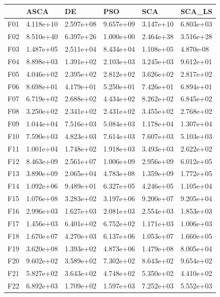\begin{tabular}{llllll}
\toprule
{} &       ASCA &         DE &        PSO &        SCA &     SCA\_LS \\
\midrule
F01  &  4.118e+10 &  2.597e+08 &  9.657e+09 &  3.147e+10 &  6.803e+03 \\
F02  &  8.510e+40 &  6.397e+26 &  1.000e+00 &  2.464e+38 &  3.516e+28 \\
F03  &  1.487e+05 &  2.511e+04 &  8.434e+04 &  1.108e+05 &  4.870e-08 \\
F04  &  8.898e+03 &  1.391e+02 &  2.103e+03 &  3.245e+03 &  9.612e+01 \\
F05  &  4.046e+02 &  2.395e+02 &  2.812e+02 &  3.626e+02 &  2.817e+02 \\
F06  &  8.698e+01 &  4.179e+01 &  5.250e+01 &  7.426e+01 &  6.894e+01 \\
F07  &  6.719e+02 &  2.688e+02 &  4.434e+02 &  8.262e+02 &  6.845e+02 \\
F08  &  3.250e+02 &  2.341e+02 &  2.431e+02 &  3.455e+02 &  2.768e+02 \\
F09  &  1.044e+04 &  7.516e+03 &  5.084e+03 &  1.178e+04 &  1.307e+04 \\
F10  &  7.590e+03 &  4.823e+03 &  7.614e+03 &  7.607e+03 &  5.103e+03 \\
F11  &  1.001e+04 &  1.748e+02 &  1.918e+03 &  3.493e+03 &  2.622e+02 \\
F12  &  8.463e+09 &  2.561e+07 &  1.006e+09 &  2.956e+09 &  6.012e+05 \\
F13  &  3.890e+09 &  2.065e+04 &  4.783e+08 &  1.359e+09 &  1.772e+05 \\
F14  &  1.092e+06 &  9.489e+01 &  6.327e+05 &  4.246e+05 &  1.105e+04 \\
F15  &  1.076e+08 &  3.283e+02 &  3.197e+06 &  9.200e+07 &  9.205e+04 \\
F16  &  2.996e+03 &  1.627e+03 &  2.081e+03 &  2.554e+03 &  1.853e+03 \\
F17  &  1.456e+03 &  6.401e+02 &  6.752e+02 &  1.171e+03 &  1.006e+03 \\
F18  &  1.670e+07 &  4.270e+03 &  6.137e+06 &  1.053e+07 &  1.660e+05 \\
F19  &  3.620e+08 &  1.393e+02 &  4.873e+06 &  1.479e+08 &  8.005e+04 \\
F20  &  9.602e+02 &  3.589e+02 &  7.302e+02 &  8.643e+02 &  9.654e+02 \\
F21  &  5.827e+02 &  3.643e+02 &  4.748e+02 &  5.350e+02 &  4.410e+02 \\
F22  &  6.892e+03 &  1.709e+02 &  1.597e+03 &  7.252e+03 &  5.552e+03 \\

\end{tabular}
